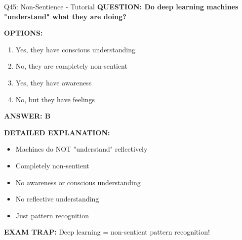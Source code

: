 \documentclass[8pt]{beamer}
\begin{document}
	\begin{frame}{Q45: Non-Sentience - Tutorial}
		\fontsize{6.5}{7.5}\selectfont
		\textbf{QUESTION: Do deep learning machines "understand" what they are doing?}
		
		\vspace{0.1cm}
		\textbf{OPTIONS:}
		\begin{enumerate}
			\item Yes, they have conscious understanding
			\item No, they are completely non-sentient
			\item Yes, they have awareness
			\item No, but they have feelings
		\end{enumerate}
		
		\vspace{0.1cm}
		\textcolor{myblue}{\textbf{ANSWER: B}}
		
		\vspace{0.1cm}
		\textbf{DETAILED EXPLANATION:}
		\begin{itemize}
			\item Machines do NOT "understand" reflectively
			\item Completely non-sentient
			\item No awareness or conscious understanding
			\item No reflective understanding
			\item Just pattern recognition
		\end{itemize}
		
		\vspace{0.1cm}
		\textcolor{myred}{\textbf{EXAM TRAP:}} Deep learning = \textcolor{myblue}{non-sentient pattern recognition}!
	\end{frame}
	
\end{document}

